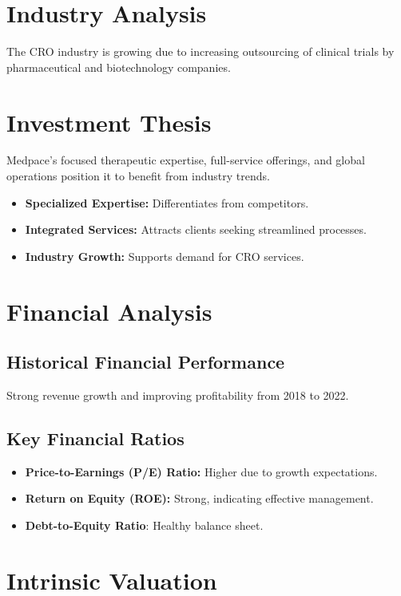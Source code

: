 \documentclass[12pt]{report}
\begin{document}
\section{Industry Analysis}
The CRO industry is growing due to increasing outsourcing of clinical trials by pharmaceutical and biotechnology companies.

\section{Investment Thesis}
Medpace's focused therapeutic expertise, full-service offerings, and global operations position it to benefit from industry trends.

\begin{itemize}
    \item \textbf{Specialized Expertise:} Differentiates from competitors.
    \item \textbf{Integrated Services:} Attracts clients seeking streamlined processes.
    \item \textbf{Industry Growth:} Supports demand for CRO services.
\end{itemize}

\section{Financial Analysis}
\subsection{Historical Financial Performance}
Strong revenue growth and improving profitability from 2018 to 2022.

\subsection{Key Financial Ratios}
\begin{itemize}
    \item \textbf{Price-to-Earnings (P/E) Ratio:} Higher due to growth expectations.
    \item \textbf{Return on Equity (ROE):} Strong, indicating effective management.
    \item \textbf{Debt-to-Equity Ratio}: Healthy balance sheet.
\end{itemize}

\section{Intrinsic Valuation}
\end{document}
